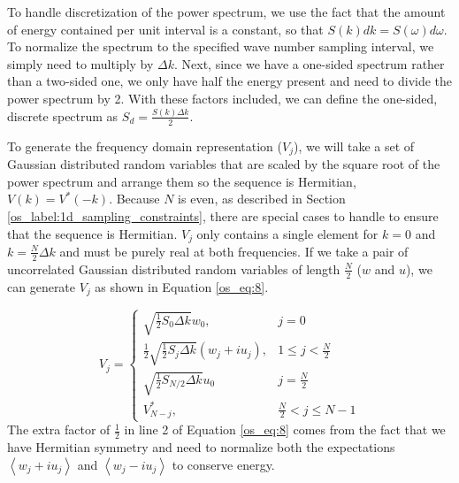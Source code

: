 To handle discretization of the power spectrum, we use the fact that the amount of energy contained per unit interval is a constant, so that $S(k)dk = S(\omega) d\omega$. To normalize the spectrum to the specified wave number sampling interval, we simply need to multiply by $\Delta k$. Next, since we have a one-sided spectrum rather than a two-sided one, we only have half the energy present and need to divide the power spectrum by 2. With these factors included, we can define the one-sided, discrete spectrum as $S_d = \frac{S(k)\Delta k}{2}$.

To generate the frequency domain representation ($V_j$), we will take a set of Gaussian distributed random variables that are scaled  by the square root of the power spectrum and arrange them so the sequence is Hermitian, $V(k) = V^*(-k)$. Because $N$ is even, as described in Section \ref{os_label:1d_sampling_constraints}, there are special cases to handle to ensure that the sequence is Hermitian. $V_j$ only contains a single element for $k = 0$ and $k = \frac{N}{2}\Delta k$ and must be purely real at both frequencies. If we take a pair of uncorrelated Gaussian distributed random variables of length $\frac{N}{2}$ ($w$ and $u$), we can generate $V_j$ as shown in Equation \ref{os_eq:8}.

\begin{equation}
  \label{os_eq:8}   
  V_j = \begin{cases}
    \sqrt{\frac{1}{2}S_0\Delta k}w_0, & j = 0 \\
    \frac{1}{2}\sqrt{\frac{1}{2}S_j\Delta k}\left(w_j + iu_j \right), & 1 \leq j < \frac{N}{2} \\
   \sqrt{\frac{1}{2}S_{N/2}\Delta k}u_0 & j = \frac{N}{2} \\
    V_{N-j}^*, &  \frac{N}{2} < j \leq N-1 
  \end{cases} 
\end{equation}
The extra factor of $\frac{1}{2}$ in line 2 of Equation \ref{os_eq:8} comes from the fact that we have Hermitian symmetry and need to normalize both the expectations $\left<w_j + iu_j\right>$ and $\left<w_j - iu_j\right>$ to conserve energy.

